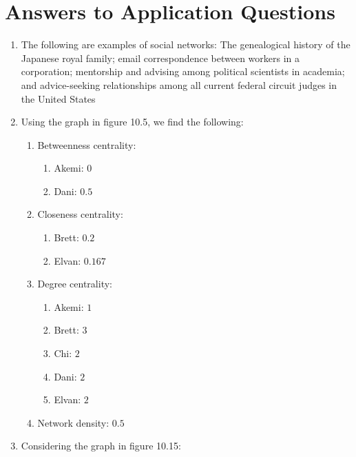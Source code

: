 \documentclass{book}
\begin{document}
\hypertarget{answers-to-application-questions-5}{%
\section{Answers to Application
Questions}\label{answers-to-application-questions-5}}

\begin{enumerate}
\def\labelenumi{\arabic{enumi}.}
\item
  The following are examples of social networks: The genealogical history of
  the Japanese royal family; email correspondence between workers in a
  corporation; mentorship and advising among political scientists in academia;
  and advice-seeking relationships among all current federal circuit judges in
  the United States
\item
  Using the graph in figure 10.5, we find the following:

  \begin{enumerate}
  \def\labelenumii{\arabic{enumii}.}
  \item
    Betweenness centrality:

    \begin{enumerate}
    \def\labelenumiii{\arabic{enumiii}.}
    \item
      Akemi: \(0\)
    \item
      Dani: \(0.5\)
    \end{enumerate}
  \item
    Closeness centrality:

    \begin{enumerate}
    \def\labelenumiii{\arabic{enumiii}.}
    \item
      Brett: \(0.2\)
    \item
      Elvan: \(0.167\)
    \end{enumerate}
  \item
    Degree centrality:

    \begin{enumerate}
    \def\labelenumiii{\arabic{enumiii}.}
    \item
      Akemi: \(1\)
    \item
      Brett: \(3\)
    \item
      Chi: \(2\)
    \item
      Dani: \(2\)
    \item
      Elvan: \(2\)
    \end{enumerate}
  \item
    Network density: \(0.5\)
  \end{enumerate}
\item
  Considering the graph in figure 10.15:


\end{enumerate}
\end{document}
